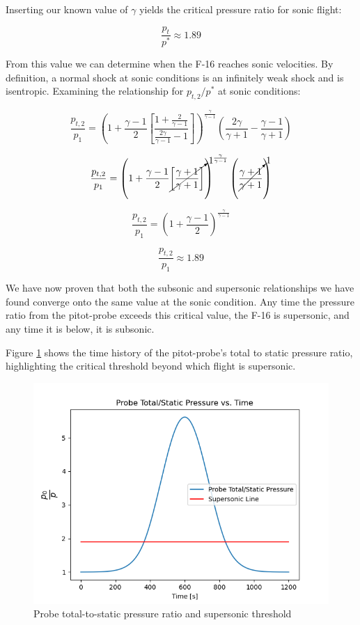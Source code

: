 \documentclass[../main.tex]{subfiles}
\begin{document}
Inserting our known value of \(\gamma\) yields the critical pressure ratio for sonic flight:

\[
    \frac{p_{t}}{p^*} \approx 1.89
\]

From this value we can determine when the F-16 reaches sonic velocities.
By definition, a normal shock at sonic conditions is an infinitely weak shock and is isentropic.
Examining the relationship for \(p_{t,2}/p^*\) at sonic conditions:

\[
    \frac{p_{t,2}}{p_1} = 
    {\left({1 + \frac{\gamma-1}{2} {\left[{\frac{1 + \frac{2}{\gamma-1}}{\frac{2\gamma}{\gamma-1}-1}}\right]} }\right)}
    ^{\frac{\gamma}{\gamma-1}}
    \left({
    \frac{2 \gamma}{\gamma+1}  -
    \frac{\gamma-1}{\gamma+1}
    }\right)
\]

\[
    \frac{p_{t,2}}{p_1} = 
    {\left({1 + \frac{\gamma-1}{2} \cancelto{1}{\left[{\frac{\gamma  + 1}{\gamma  + 1}}\right]} }\right)}
    ^{\frac{\gamma}{\gamma-1}}
    \left({
    \cancelto{1}{\frac{\gamma+1}{\gamma+1}}
    }\right)
\]

\[
    \frac{p_{t,2}}{p_1} = 
    {\left({1 + \frac{\gamma-1}{2}}\right)}
    ^{\frac{\gamma}{\gamma-1}}
\]

\[
    \frac{p_{t,2}}{p_1} \approx 1.89
\]

We have now proven that both the subsonic and supersonic relationships we have found converge onto the same value at the sonic condition.
Any time the pressure ratio from the pitot-probe exceeds this critical value, the F-16 is supersonic, and any time it is below, it is subsonic.

\discussion{}

Figure \ref{P_ratio} shows the time history of the pitot-probe's total to static pressure ratio, highlighting the critical threshold beyond which flight is supersonic.

\begin{figure}[h]
    \centering
    \includegraphics[scale=.7]{../images/problem_2/Probe_P_ratio_vs_Time_F16.png}
    \caption{Probe total-to-static pressure ratio and supersonic threshold}
    \label{P_ratio}
\end{figure}
\end{document}
